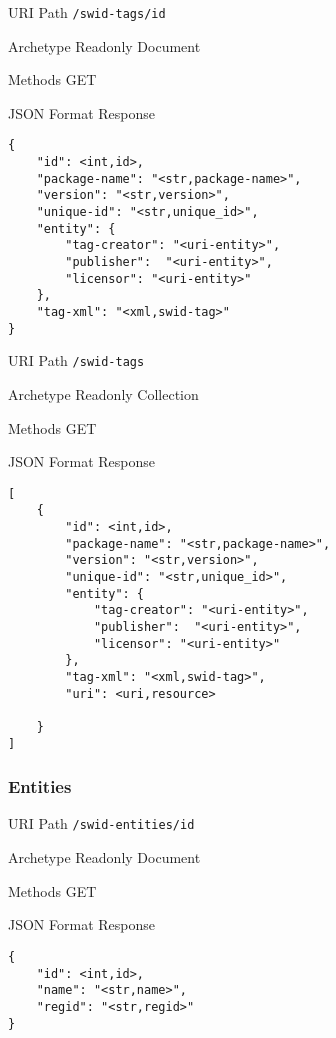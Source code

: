 \documentclass[10pt,a4paper]{scrartcl}
\begin{document}
\begin{mdframed}[style=def]
\begin{description*}
	\item[URI Path] \texttt{/swid-tags/{id}}
	\item[Archetype] Readonly Document
	\item[Methods] GET
	\item[JSON Format Response] \hfill
\begin{lstlisting}
{
	"id": <int,id>,
	"package-name": "<str,package-name>",
	"version": "<str,version>",
	"unique-id": "<str,unique_id>",
	"entity": {
		"tag-creator": "<uri-entity>",
		"publisher":  "<uri-entity>",
		"licensor": "<uri-entity>"
	},
	"tag-xml": "<xml,swid-tag>"
}
\end{lstlisting}
\end{description*}
\end{mdframed}

\begin{mdframed}[style=def]
\begin{description*}
	\item[URI Path] \texttt{/swid-tags}
	\item[Archetype] Readonly Collection
	\item[Methods] GET
	\item[JSON Format Response] \hfill
\begin{lstlisting}
[
	{
		"id": <int,id>,
    	"package-name": "<str,package-name>",
    	"version": "<str,version>",
    	"unique-id": "<str,unique_id>",
    	"entity": {
    		"tag-creator": "<uri-entity>",
    		"publisher":  "<uri-entity>",
    		"licensor": "<uri-entity>"
    	},
    	"tag-xml": "<xml,swid-tag>",
    	"uri": <uri,resource>
    	
	}
]
\end{lstlisting}
\end{description*}
\end{mdframed}


\pagebreak
\subsubsection{Entities}

\begin{mdframed}[style=def]
\begin{description*}
	\item[URI Path] \texttt{/swid-entities/{id}}
	\item[Archetype] Readonly Document
	\item[Methods] GET
	\item[JSON Format Response] \hfill
\begin{lstlisting}
{
	"id": <int,id>,
	"name": "<str,name>",
	"regid": "<str,regid>"
}
\end{lstlisting}
\end{description*}
\end{mdframed}
\end{document}
